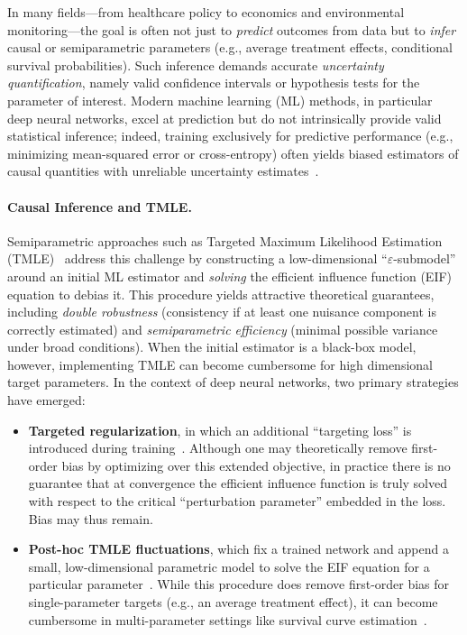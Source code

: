 \documentclass{article}
\theoremstyle{remark}
\begin{document}
In many fields---from healthcare policy to economics and environmental monitoring---the goal is often not just to \emph{predict} outcomes from data but to \emph{infer} causal or semiparametric parameters (e.g., average treatment effects, conditional survival probabilities). Such inference demands accurate \emph{uncertainty quantification}, namely valid confidence intervals or hypothesis tests for the parameter of interest. Modern machine learning (ML) methods, in particular deep neural networks, excel at prediction but do not intrinsically provide valid statistical inference; indeed, training exclusively for predictive performance (e.g., minimizing mean-squared error or cross-entropy) often yields biased estimators of causal quantities with unreliable uncertainty estimates~\cite{chernozhukov2018double,shalit2017estimating}. 

\paragraph{Causal Inference and TMLE.}
Semiparametric approaches such as Targeted Maximum Likelihood Estimation (TMLE)~\cite{van2011targeted,van2018targeted} address this challenge by constructing a low-dimensional ``$\varepsilon$-submodel'' around an initial ML estimator and \emph{solving} the efficient influence function (EIF) equation to debias it. This procedure yields attractive theoretical guarantees, including \emph{double robustness} (consistency if at least one nuisance component is correctly estimated) and \emph{semiparametric efficiency} (minimal possible variance under broad conditions). When the initial estimator is a black-box model, however, implementing TMLE can become cumbersome for high dimensional target parameters. In the context of deep neural networks, two primary strategies have emerged:  
\begin{itemize}[leftmargin=2em]
    \item \textbf{Targeted regularization}, in which an additional ``targeting loss'' is introduced during training~\cite{shi2019adapting,chernozhukov_riesznet_2022}. Although one may theoretically remove first-order bias by optimizing over this extended objective, in practice there is no guarantee that at convergence the efficient influence function is truly solved with respect to the critical ``perturbation parameter'' embedded in the loss. Bias may thus remain.
    \item \textbf{Post-hoc TMLE fluctuations}, which fix a trained network and append a small, low-dimensional parametric model to solve the EIF equation for a particular parameter~\cite{chernozhukov_riesznet_2022,shirakawa2024longitudinal}. While this procedure does remove first-order bias for single-parameter targets (e.g., an average treatment effect), it can become cumbersome in multi-parameter settings like survival curve estimation~\cite{rytgaard2024one}.
\end{itemize}
\end{document}
